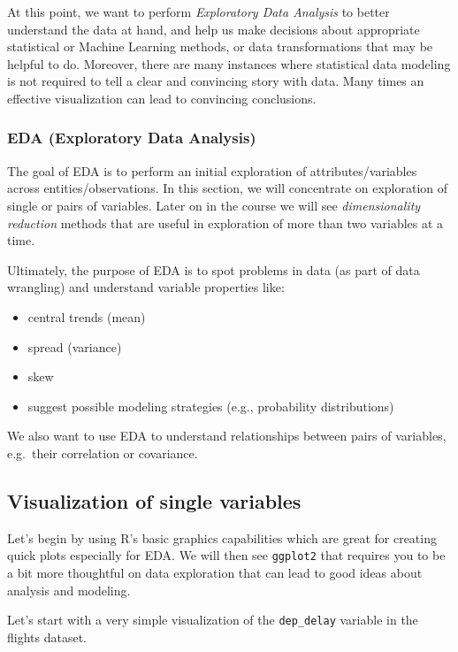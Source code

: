 \documentclass[]{article}
\theoremstyle{definition}
\theoremstyle{definition}
\theoremstyle{remark}
\begin{document}
At this point, we want to perform \emph{Exploratory Data Analysis} to
better understand the data at hand, and help us make decisions about
appropriate statistical or Machine Learning methods, or data
transformations that may be helpful to do. Moreover, there are many
instances where statistical data modeling is not required to tell a
clear and convincing story with data. Many times an effective
visualization can lead to convincing conclusions.

\subsubsection{EDA (Exploratory Data
Analysis)}\label{eda-exploratory-data-analysis}

The goal of EDA is to perform an initial exploration of
attributes/variables across entities/observations. In this section, we
will concentrate on exploration of single or pairs of variables. Later
on in the course we will see \emph{dimensionality reduction} methods
that are useful in exploration of more than two variables at a time.

Ultimately, the purpose of EDA is to spot problems in data (as part of
data wrangling) and understand variable properties like:

\begin{itemize}
\itemsep1pt\parskip0pt
\item
  central trends (mean)
\item
  spread (variance)
\item
  skew
\item
  suggest possible modeling strategies (e.g., probability distributions)
\end{itemize}

We also want to use EDA to understand relationships between pairs of
variables, e.g.~their correlation or covariance.

\subsection{Visualization of single
variables}\label{visualization-of-single-variables}

Let's begin by using R's basic graphics capabilities which are great for
creating quick plots especially for EDA. We will then see
\texttt{ggplot2} that requires you to be a bit more thoughtful on data
exploration that can lead to good ideas about analysis and modeling.

Let's start with a very simple visualization of the \texttt{dep\_delay}
variable in the flights dataset.
\end{document}
